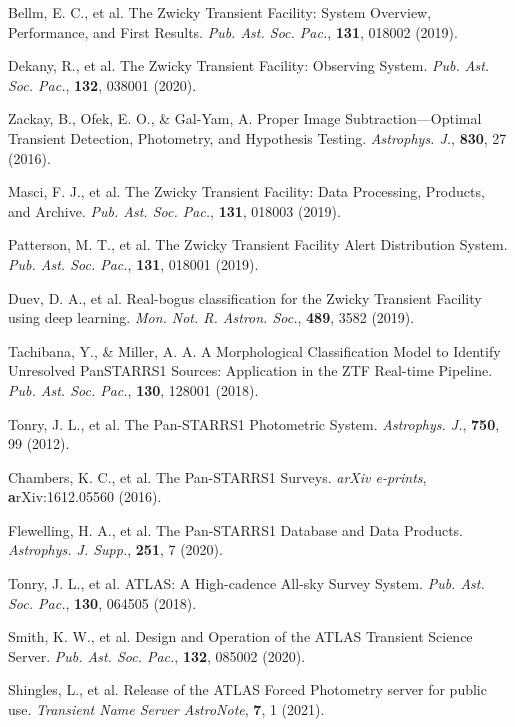 \documentclass{nature_plusfigure}
\newcommand{\mn}{{Mon. Not. R. Astron. Soc.}}
\newcommand{\mnras}{\mn}
\newcommand{\apj}{{Astrophys. J.}}
\newcommand{\apjs}{{Astrophys. J. Supp.}}
\newcommand{\pasp}{{Pub. Ast. Soc. Pac.}}
\begin{document}
\begin{methods}
\begin{thebibliography}{10}
 Bellm, E. C., et al. The Zwicky Transient Facility: System Overview, Performance, and First Results. \emph{\pasp}, \textbf{131}, 018002 (2019). 

 Dekany, R., et al. The Zwicky Transient Facility: Observing System. \emph{\pasp}, \textbf{132}, 038001 (2020). 

 Zackay, B., Ofek, E. O., \& Gal-Yam, A. Proper Image Subtraction—Optimal Transient Detection, Photometry, and Hypothesis Testing. \emph{\apj}, \textbf{830}, 27 (2016). 

 Masci, F. J., et al. The Zwicky Transient Facility: Data Processing, Products, and Archive. \emph{\pasp}, \textbf{131}, 018003 (2019). 

 Patterson, M. T., et al. The Zwicky Transient Facility Alert Distribution System. \emph{\pasp}, \textbf{131}, 018001 (2019). 

  Duev, D. A., et al. Real-bogus classification for the Zwicky Transient Facility using deep learning. \emph{\mnras}, \textbf{489}, 3582 (2019). 

 Tachibana, Y., \& Miller, A. A. A Morphological Classification Model to Identify Unresolved PanSTARRS1 Sources: Application in the ZTF Real-time Pipeline. \emph{\pasp}, \textbf{130}, 128001 (2018). 


 Tonry, J. L., et al. The Pan-STARRS1 Photometric System. \emph{\apj}, \textbf{750}, 99 (2012). 

 Chambers, K. C., et al. The Pan-STARRS1 Surveys. \emph{arXiv e-prints}, \textbf arXiv:1612.05560 (2016). 

  Flewelling, H. A., et al. The Pan-STARRS1 Database and Data Products. \emph{\apjs}, \textbf{251}, 7 (2020). 


 Tonry, J. L., et al. ATLAS: A High-cadence All-sky Survey System. \emph{\pasp}, \textbf{130}, 064505 (2018). 

 Smith, K. W., et al. Design and Operation of the ATLAS Transient Science Server. \emph{\pasp}, \textbf{132}, 085002 (2020). 

 Shingles, L., et al. Release of the ATLAS Forced Photometry server for public use. \emph{Transient Name Server AstroNote}, \textbf{7}, 1 (2021). 


\end{thebibliography}
\end{methods}
\end{document}
